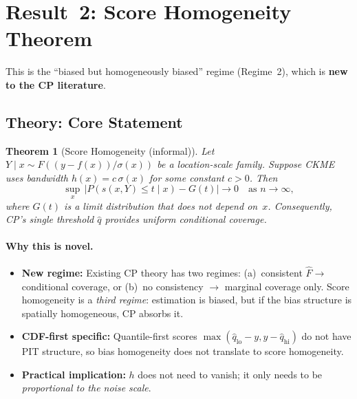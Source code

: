 \documentclass[11pt]{article}
\newtheorem{theorem}{Theorem}
\begin{document}
\section{Result~2: Score Homogeneity Theorem}
\label{sec:score-homog}

This is the ``biased but homogeneously biased'' regime (Regime~2),
which is \textbf{new to the CP literature}.

\subsection{Theory: Core Statement}

\begin{theorem}[Score Homogeneity (informal)]
\label{thm:score-homog}
Let $Y \mid x \sim F((y - f(x))/\sigma(x))$ be a location-scale
family. Suppose CKME uses bandwidth $h(x) = c\,\sigma(x)$ for some
constant $c > 0$. Then
\[
  \sup_{x}\, \bigl| P(s(x, Y) \le t \mid x) - G(t) \bigr|
  \to 0 \quad \text{as } n \to \infty,
\]
where $G(t)$ is a limit distribution that does not depend on~$x$.
Consequently, CP's single threshold $\hat q$ provides uniform
conditional coverage.
\end{theorem}

\paragraph{Why this is novel.}
\begin{itemize}
  \item \textbf{New regime:} Existing CP theory has two regimes:
    (a)~consistent $\hat F \to$ conditional coverage, or (b)~no
    consistency $\to$ marginal coverage only. Score homogeneity is a
    \emph{third regime}: estimation is biased, but if the bias
    structure is spatially homogeneous, CP absorbs it.
  \item \textbf{CDF-first specific:} Quantile-first scores
    $\max(\hat q_{\mathrm{lo}} - y, y - \hat q_{\mathrm{hi}})$ do
    not have PIT structure, so bias homogeneity does not translate to
    score homogeneity.
  \item \textbf{Practical implication:} $h$ does not need to vanish;
    it only needs to be \emph{proportional to the noise scale}.
\end{itemize}
\end{document}
